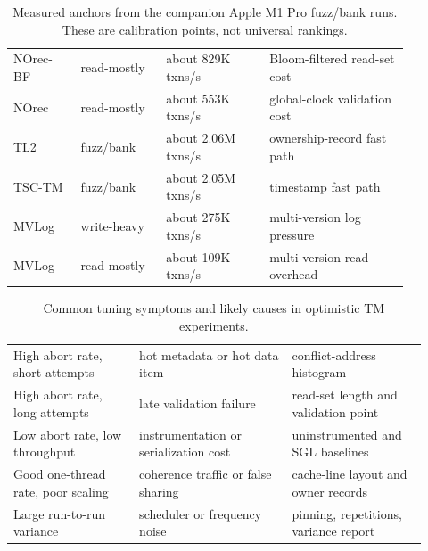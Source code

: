 \begin{table}[htbp]
\centering
\caption{Measured anchors from the companion Apple M1 Pro fuzz/bank runs. These are calibration points, not universal rankings.}
\label{tab:perf-anchors}
\begin{tabular}{M{0.15\linewidth}M{0.19\linewidth}M{0.23\linewidth}M{0.31\linewidth}}
\hline
{} &  &  &  \\
\hline
NOrec-BF & read-mostly & about 829K txns/s & Bloom-filtered read-set cost \\
NOrec & read-mostly & about 553K txns/s & global-clock validation cost \\
TL2 & fuzz/bank & about 2.06M txns/s & ownership-record fast path \\
TSC-TM & fuzz/bank & about 2.05M txns/s & timestamp fast path \\
MVLog & write-heavy & about 275K txns/s & multi-version log pressure \\
MVLog & read-mostly & about 109K txns/s & multi-version read overhead \\
\hline
\end{tabular}
\end{table}

\begin{table}[htbp]
\centering
\caption{Common tuning symptoms and likely causes in optimistic TM experiments.}
\label{tab:perf-symptoms}
\begin{tabular}{M{0.28\linewidth}M{0.34\linewidth}M{0.30\linewidth}}
\hline
{} &  &  \\
\hline
High abort rate, short attempts & hot metadata or hot data item & conflict-address histogram \\
High abort rate, long attempts & late validation failure & read-set length and validation point \\
Low abort rate, low throughput & instrumentation or serialization cost & uninstrumented and SGL baselines \\
Good one-thread rate, poor scaling & coherence traffic or false sharing & cache-line layout and owner records \\
Large run-to-run variance & scheduler or frequency noise & pinning, repetitions, variance report \\
\hline
\end{tabular}
\end{table}

